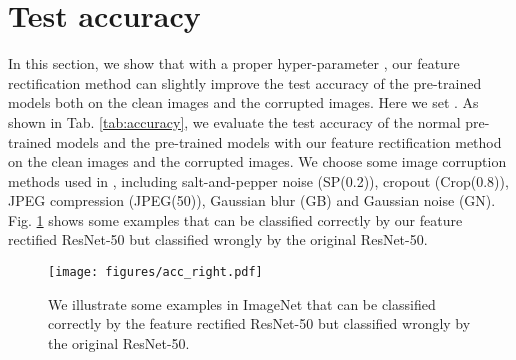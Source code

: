 \documentclass{article}
\begin{document}
\section{Test accuracy}\label{App:testacc}

In this section, we show that with a proper hyper-parameter , our feature rectification method can slightly improve the test accuracy of the pre-trained models both on the clean images and the corrupted images. Here we set . As shown in Tab. \ref{tab:accuracy}, we evaluate the test accuracy of the normal pre-trained models and the pre-trained models with our feature rectification method on the clean images and the corrupted images. We choose some image corruption methods used in \cite{hendrycks2018benchmarking}, including salt-and-pepper noise (SP(0.2)), cropout (Crop(0.8)), JPEG compression (JPEG(50)), Gaussian blur (GB) and Gaussian noise (GN). Fig. \ref{img:acc_right} shows some examples that can be classified correctly by our feature rectified ResNet-50 but classified wrongly by the original ResNet-50.

\begin{table}[htbp]
\caption{Test accuracy on ImageNet with the pre-trained ResNet-50 and DenseNet-121. Our method rectifies the feature vector of the model and performs well on both the clean images and the corrupted images. The best results are in bold.}
\end{table}

\begin{figure}[htbp]
\centering
\texttt{[image: figures/acc\_right.pdf]}
\caption{We illustrate some examples in ImageNet that can be classified correctly by the feature rectified ResNet-50 but classified wrongly by the original ResNet-50.}
\label{img:acc_right}
\end{figure}
\end{document}
